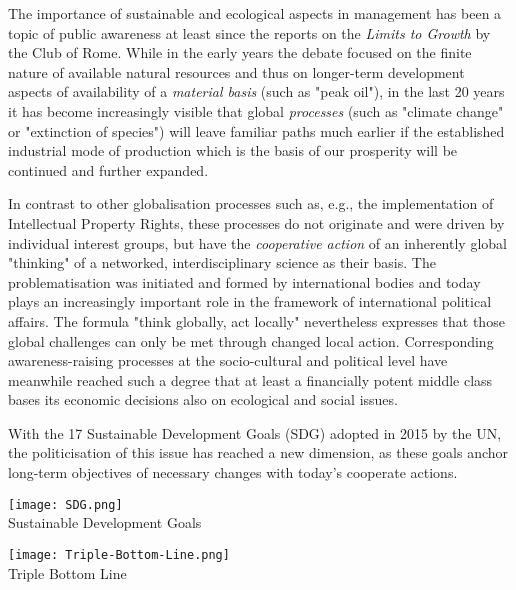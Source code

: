 \documentclass[11pt,a4paper]{article}
\begin{document}
The importance of sustainable and ecological aspects in management has been a
topic of public awareness at least since the reports on the \emph{Limits to
  Growth} by the Club of Rome. While in the early years the debate focused on
the finite nature of available natural resources and thus on longer-term
development aspects of availability of a \emph{material basis} (such as "peak
oil"), in the last 20 years it has become increasingly visible that global
\emph{processes} (such as "climate change" or "extinction of species") will
leave familiar paths much earlier if the established industrial mode of
production which is the basis of our prosperity will be continued and further
expanded.

In contrast to other globalisation processes such as, e.g., the implementation
of Intellectual Property Rights, these processes do not originate and were
driven by individual interest groups, but have the \emph{cooperative action}
of an inherently global "thinking" of a networked, interdisciplinary science
as their basis. The problematisation was initiated and formed by international
bodies and today plays an increasingly important role in the framework of
international political affairs. The formula "think globally, act locally"
nevertheless expresses that those global challenges can only be met through
changed local action. Corresponding awareness-raising processes at the
socio-cultural and political level have meanwhile reached such a degree that
at least a financially potent middle class bases its economic decisions also
on ecological and social issues.

With the 17 Sustainable Development Goals (SDG) adopted in 2015 by the UN, the
politicisation of this issue has reached a new dimension, as these goals
anchor long-term objectives of necessary changes with today's cooperate
actions.

\begin{center}
  \begin{minipage}{.55\textwidth}\centering
    \texttt{[image: SDG.png]}\\
    Sustainable Development Goals
  \end{minipage}\hfill
  \begin{minipage}{.4\textwidth}\centering
    \texttt{[image: Triple-Bottom-Line.png]}\\[1em]
    Triple Bottom Line
  \end{minipage}

\end{center}
\end{document}
